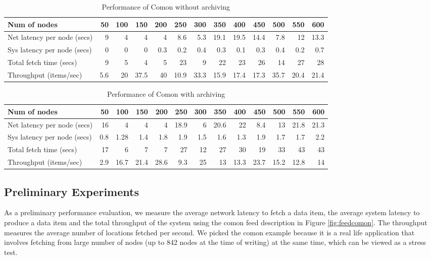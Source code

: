 \begin{table*}[th]
\begin{center}
\begin{tabular}{|l|r|r|r|r|r|r|r|r|r|r|r|r|}\hline
Num of nodes&	50&	100&	150&	200&	250&	300&	350&	400&	450&	500&	550&	600 \\ \hline\hline
Net latency per node (secs)&	9&	4&	4&	4&	8.6&	5.3&	19.1&	19.5&	14.4&	7.8&	12&	13.3 \\ \hline
Sys latency per node (secs)&	0&	0&	0&	0.3&	0.2&	0.4&	0.3&	0.1&	0.3&	0.4&	0.2&	0.7 \\ \hline
Total fetch time (secs)&	9&	5&	4&	5&	23&	9&	22&	23&	26&	14&	27&	28 \\ \hline	
Throughput (items/sec)&	5.6&	20&	37.5&	40&	10.9&	33.3&	15.9&	17.4&	17.3&	35.7&	20.4&	21.4 \\ \hline
\end{tabular}
\end{center}
\caption{Performance of Comon without archiving}
\label{tab:comon-noarch}
\end{table*}


\begin{table*}
\begin{center}
\begin{tabular}{|l|r|r|r|r|r|r|r|r|r|r|r|r|}\hline
Num of nodes&	50&	100&	150&	200&	250&	300&	350&	400&	450&	500&	550&	600 \\ \hline\hline
Net latency per node (secs)&	16&	4&	4&	4&	18.9&	6&	20.6&	22&	8.4&	13&	21.8&	21.3 \\ \hline
Sys latency per node (secs)&	0.8&	1.28&	1.4&	1.8&	1.9&	1.5&	1.6&	1.3&	1.9&	1.7&	1.7&	2.2 \\ \hline
Total fetch time (secs)&	17&	6&	7&	7&	27&	12&	27&	30&	19&	33&	43&	43 \\ \hline
Throughput (items/sec)&	2.9&	16.7&	21.4&	28.6&	9.3&	25&	13&	13.3&	23.7&	15.2&	12.8&	14 \\ \hline
\end{tabular}
\end{center}
\caption{Performance of Comon with archiving}
\label{tab:comon-arch}
\end{table*}

\subsection{Preliminary Experiments}
As a preliminary performance evaluation, 
we measure the average network latency
to fetch a data item, the average system latency 
to produce a data item
and the total throughput of the system using the comon feed
description in Figure \ref{fig:feedcomon}. 
The throughput measures the average
number of locations fetched per second. We picked
the comon example because it is a real life
application that involves fetching from large number of 
nodes (up to 842 nodes at the time of writing)
at the same time, which can be viewed as a stress test. 


